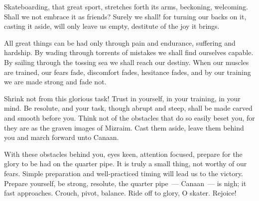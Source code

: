 Skateboarding, that great sport, stretches forth its arms, beckoning, welcoming. Shall we not embrace it as friends? Surely we shall! for turning our backs on it, casting it aside, will only leave us empty, destitute of the joy it brings.

All great things can be had only through pain and endurance, suffering and hardship. By wading through torrents of mistakes we shall find ourselves capable. By sailing through the tossing sea we shall reach our destiny. When our muscles are trained, our fears fade, discomfort fades, hesitance fades, and by our training we are made strong and fade not.

Shrink not from this glorious task! Trust in yourself, in your training, in your mind. Be resolute, and your task, though abrupt and steep, shall be made carved and smooth before you. Think not of the obstacles that do so easily beset you, for they are as the graven images of Mizraim. Cast them aside, leave them behind you and march forward unto Canaan.

With these obstacles behind you, eyes keen, attention focused, prepare for the glory to be had on the quarter pipe. It is truly a small thing, not worthy of our fears. Simple preparation and well-practiced timing will lead us to the victory. Prepare yourself, be strong, resolute, the quarter pipe~--- Canaan~--- is nigh; it fast approaches. Crouch, pivot, balance. Ride off to glory, O skater. Rejoice!
